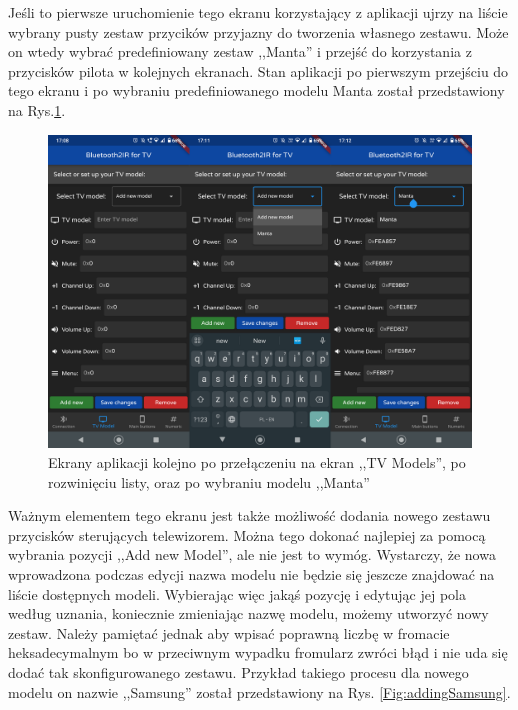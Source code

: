 \documentclass[12pt,twoside,draft]{article}
\begin{document}
Jeśli to pierwsze uruchomienie tego ekranu korzystający z aplikacji ujrzy na liście wybrany pusty zestaw przycików przyjazny do tworzenia własnego zestawu. Może on wtedy wybrać predefiniowany zestaw ,,Manta'' i przejść do korzystania z przycisków pilota w kolejnych ekranach. Stan aplikacji po pierwszym przejściu do tego ekranu i po wybraniu predefiniowanego modelu Manta został przedstawiony na Rys.\ref*{Fig:choosingManta}.
\begin{figure}[ht]
   \centering
   \includegraphics[width=14cm]{images/choosingManta.png}
   \caption{Ekrany aplikacji kolejno po przełączeniu na ekran ,,TV Models'', po rozwinięciu listy, oraz po wybraniu modelu ,,Manta''}
   \label{Fig:choosingManta}
\end{figure}

Ważnym elementem tego ekranu jest także możliwość dodania nowego zestawu przycisków sterujących telewizorem. Można tego dokonać najlepiej za pomocą wybrania pozycji ,,Add new Model'', ale nie jest to wymóg. Wystarczy, że nowa wprowadzona podczas edycji nazwa modelu nie będzie się jeszcze znajdować na liście dostępnych modeli. Wybierając więc jakąś pozycję i edytując jej pola według uznania, koniecznie zmieniając nazwę modelu, możemy utworzyć nowy zestaw. Należy pamiętać jednak aby wpisać poprawną liczbę w fromacie heksadecymalnym bo w przeciwnym wypadku fromularz zwróci błąd i nie uda się dodać tak skonfigurowanego zestawu. Przykład takiego procesu dla nowego modelu on nazwie ,,Samsung'' został przedstawiony na Rys. \ref*{Fig:addingSamsung}.
\end{document}
